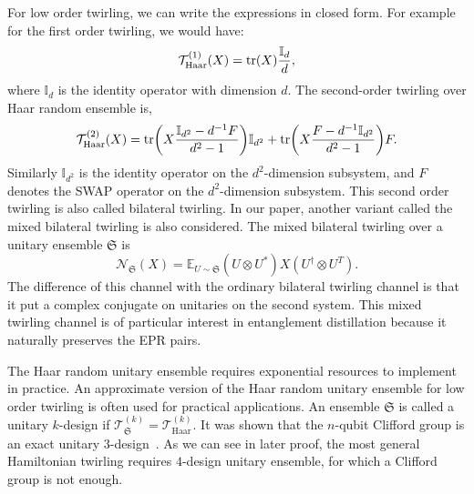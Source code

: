 \documentclass[onecolumn,prx,longbibliography,nofootinbib, superscriptaddress]{revtex4-2}
\theoremstyle{recap}
\newcommand{\id}{\mathbb{I}}
\begin{document}
For low order twirling, we can write the expressions in closed form. For example for the first order twirling, we would have:
\begin{equation}
    \mathcal{T}_{\mathrm{Haar}}^{(1)}(X)=\tr(X)\frac{\mathbb{I}_d}{d},
\end{equation}
where $\mathbb{I}_{d}$ is the identity operator with dimension $d$. The second-order twirling over Haar random ensemble is,
\begin{equation}\label{eq:secondtwirling}
\begin{split}
    \mathcal{T}_{\mathrm{Haar}}^{(2)}(X)=\tr(X \frac{\mathbb{I}_{d^2}-d^{-1} F}{d^2-1})\id_{d^2}+\tr(X \frac{F-d^{-1} \id_{d^2}}{d^2-1})F.
\end{split}
\end{equation}
Similarly $\id_{d^2}$ is the identity operator on the $d^2$-dimension subsystem, and $F$ denotes the SWAP operator on the $d^2$-dimension subsystem. This second order twirling is also called bilateral twirling. In our paper, another variant called the mixed bilateral twirling is also considered. The mixed bilateral twirling over a unitary ensemble $\mathfrak{S}$ is
\begin{equation}
    \mathcal{N}_{\mathfrak{S}}(X)=\mathbb{E}_{U\sim\mathfrak{S}}(U\otimes U^{*})X(U^{\dagger}\otimes U^{T}).
\end{equation}
The difference of this channel with the ordinary bilateral twirling channel is that it put a complex conjugate on unitaries on the second system. This mixed twirling channel is of particular interest in entanglement distillation because it naturally preserves the EPR pairs.

The Haar random unitary ensemble  requires exponential resources to implement in practice. An approximate version of the Haar random unitary ensemble for low order twirling is often used for practical applications. An ensemble $\mathfrak{S}$ is called a unitary $k$-design if $\mathcal{T}^{(k)}_{\mathfrak{S}} = \mathcal{T}^{(k)}_{\mathrm{Haar}}$. It was shown that the $n$-qubit Clifford group is an exact unitary 3-design~\cite{Webb2016Clifford3design,Zhu2017MultiqubitClifford}. As we can see in later proof, the most general Hamiltonian twirling requires $4$-design unitary ensemble, for which a Clifford group is not enough. 
\end{document}
